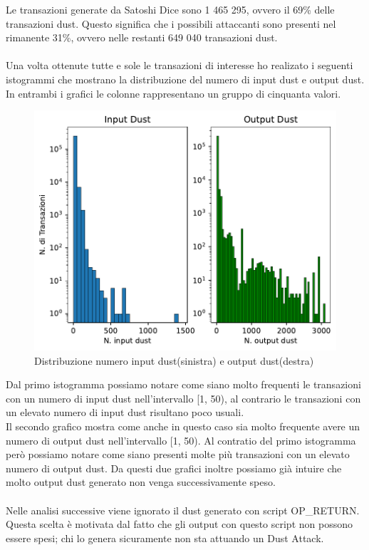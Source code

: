 Le transazioni generate da Satoshi Dice sono 1 465 295, ovvero il 69\% delle transazioni dust. Questo significa che i possibili attaccanti sono presenti nel rimanente 31\%, ovvero nelle restanti 649 040 transazioni dust.\\\\
Una volta ottenute tutte e sole le transazioni di interesse ho realizato i seguenti istogrammi che mostrano la distribuzione del numero di input dust e output dust. In entrambi i grafici le colonne rappresentano un gruppo di cinquanta valori.
\begin{figure}[h!]
    \centering
    \includegraphics[scale=1]{Grafici/distribuzione_dust.pdf}
    \caption{Distribuzione numero input dust(sinistra) e output dust(destra)}
    \label{fig:dust_distribuzione}
\end{figure}
\FloatBarrier 
Dal primo istogramma possiamo notare come siano molto frequenti le transazioni con un numero di input dust nell'intervallo [1, 50), al contrario le transazioni con un elevato numero di input dust risultano poco usuali.\\
Il secondo grafico mostra come anche in questo caso sia molto frequente avere un numero di output dust nell'intervallo [1, 50). Al contratio del primo istogramma però possiamo notare come siano presenti molte più transazioni con un elevato numero di output dust. Da questi due grafici inoltre possiamo già intuire che molto output dust generato non venga successivamente speso.\\\\ 
Nelle analisi successive viene ignorato il dust generato con script OP\_RETURN. Questa scelta è motivata dal fatto che gli output con questo script non possono essere spesi; chi lo genera sicuramente non sta attuando un Dust Attack.\\
